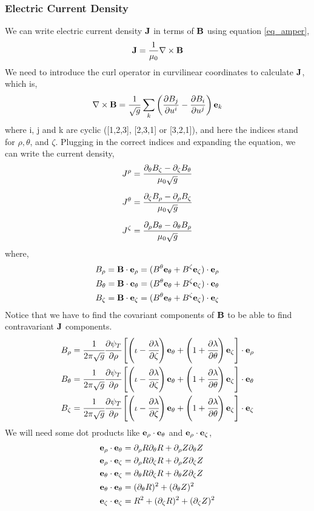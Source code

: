 




\subsubsection{Electric Current Density}

We can write electric current density $\J$ in terms of $\B$ using equation \ref{eq_amper},
\begin{equation}
    \J = \frac{1}{\mu_0} \nabla \times \B
\end{equation}
We need to introduce the curl operator in curvilinear coordinates to calculate $\J$, which is,
\begin{equation}
    \nabla \times \B = \frac{1}{\jac} \sum_{k} \left( \frac{\partial B_j}{\partial u^i}  - \frac{\partial B_i}{\partial u^j}\right) \e_k
\end{equation}
where i, j and k are cyclic ([1,2,3], [2,3,1] or [3,2,1]), and here the indices stand for $\rho, \theta$, and $\zeta$. Plugging in the correct indices and expanding the equation, we can write the current density,
\begin{align}
    J^\rho &= \frac{\partial_\theta B_\zeta - \partial_\zeta B_\theta}{\mu_0 \jac} \\[.2cm]
    J^\theta &= \frac{\partial_\zeta B_\rho - \partial_\rho B_\zeta}{\mu_0 \jac} \\[.2cm]
    J^\zeta &= \frac{\partial_\rho B_\theta - \partial_\theta B_\rho}{\mu_0 \jac}
\end{align}
where,
\begin{align}
    B_\rho = \B \cdot \e_\rho = \Brho \\
    B_\theta = \B \cdot \e_\theta = \Btheta \\
    B_\zeta = \B \cdot \e_\zeta = \Bzeta
\end{align}
Notice that we have to find the covariant components of $\B$ to be able to find contravariant $\J$ components. 
\begin{align}
    B_\rho &= \Bvector \cdot \e_\rho \\
    B_\theta &= \Bvector \cdot \e_\theta \\
    B_\zeta &= \Bvector \cdot \e_\zeta
\end{align}
We will need some dot products like $\e_\rho \cdot \e_\theta$ and $\e_\rho \cdot \e_\zeta$,
\begin{align}
    \e_\rho \cdot \e_\theta &= \partial_\rho R \partial_\theta R + \partial_\rho Z \partial_\theta Z \\
    \e_\rho \cdot \e_\zeta &= \partial_\rho R \partial_\zeta R + \partial_\rho Z \partial_\zeta Z \\
    \e_\theta \cdot \e_\zeta &= \partial_\theta R \partial_\zeta R + \partial_\theta Z \partial_\zeta Z \\
    \e_\theta \cdot \e_\theta &= (\partial_\theta R)^2 + (\partial_\theta Z)^2 \\
    \e_\zeta \cdot \e_\zeta &= R^2 + (\partial_\zeta R)^2 + (\partial_\zeta Z)^2
\end{align}
